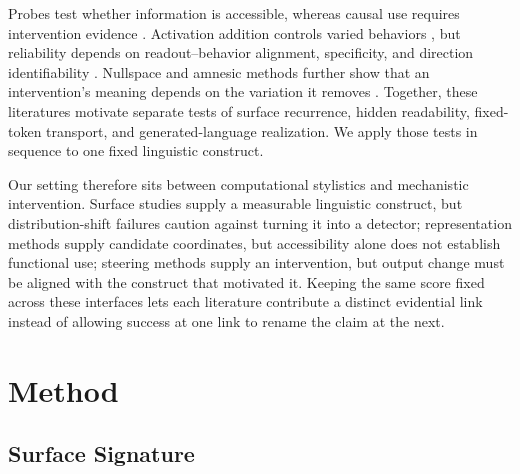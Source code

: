 Probes test whether information is accessible, whereas causal use requires intervention evidence \citep{hewitt2019probe}. Activation addition controls varied behaviors \citep{turner2023activation,rimsky2024caa,li2023iti}, but reliability depends on readout--behavior alignment, specificity, and direction identifiability \citep{canby2025reliable,waldis2026aligned,goyal2026specificity,venkatesh2026nonidentifiability}. Nullspace and amnesic methods further show that an intervention's meaning depends on the variation it removes \citep{ravfogel2020inlp,elazar2021amnesic}. Together, these literatures motivate separate tests of surface recurrence, hidden readability, fixed-token transport, and generated-language realization. We apply those tests in sequence to one fixed linguistic construct.

Our setting therefore sits between computational stylistics and mechanistic intervention. Surface studies supply a measurable linguistic construct, but distribution-shift failures caution against turning it into a detector; representation methods supply candidate coordinates, but accessibility alone does not establish functional use; steering methods supply an intervention, but output change must be aligned with the construct that motivated it. Keeping the same score fixed across these interfaces lets each literature contribute a distinct evidential link instead of allowing success at one link to rename the claim at the next.

\section{Method}
\label{sec:method}

\subsection{Surface Signature}
\label{sec:construct}

